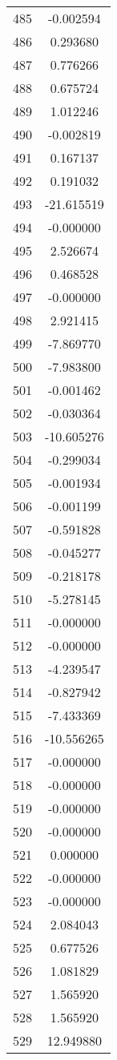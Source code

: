\documentclass[12pt]{article}
\begin{document}
\begin{longtable}{@{}cc@{}}
485 & -0.002594 \\
486 & 0.293680 \\
487 & 0.776266 \\
488 & 0.675724 \\
489 & 1.012246 \\
490 & -0.002819 \\
491 & 0.167137 \\
492 & 0.191032 \\
493 & -21.615519 \\
494 & -0.000000 \\
495 & 2.526674 \\
496 & 0.468528 \\
497 & -0.000000 \\
498 & 2.921415 \\
499 & -7.869770 \\
500 & -7.983800 \\
501 & -0.001462 \\
502 & -0.030364 \\
503 & -10.605276 \\
504 & -0.299034 \\
505 & -0.001934 \\
506 & -0.001199 \\
507 & -0.591828 \\
508 & -0.045277 \\
509 & -0.218178 \\
510 & -5.278145 \\
511 & -0.000000 \\
512 & -0.000000 \\
513 & -4.239547 \\
514 & -0.827942 \\
515 & -7.433369 \\
516 & -10.556265 \\
517 & -0.000000 \\
518 & -0.000000 \\
519 & -0.000000 \\
520 & -0.000000 \\
521 & 0.000000 \\
522 & -0.000000 \\
523 & -0.000000 \\
524 & 2.084043 \\
525 & 0.677526 \\
526 & 1.081829 \\
527 & 1.565920 \\
528 & 1.565920 \\
529 & 12.949880 \\

\end{longtable}
\end{document}
